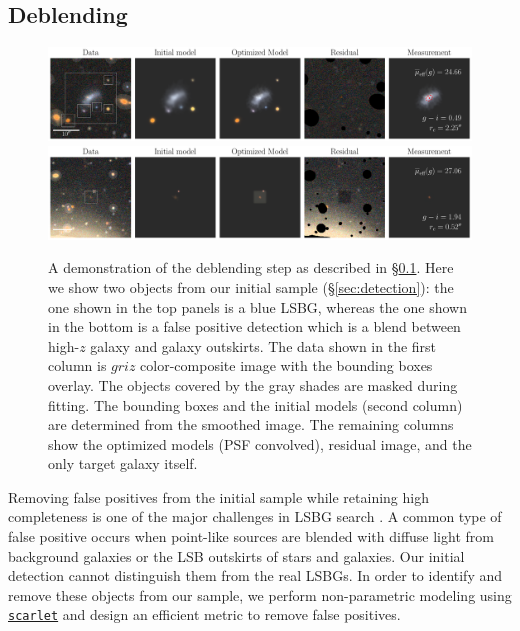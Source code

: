 \documentclass[twocolumn,astrosymb,twocolappendix]{aastex631}
\newcommand{\code}[1]{\texttt{#1}}
\begin{document}
\begin{CJK*}{UTF8}{gbsn}
\subsection{Deblending}\label{sec:deblending}

\begin{figure}
	\vbox{ 
		\centering
		\includegraphics[width=1\linewidth]{vanilla_scarlet_demo.pdf}
		\includegraphics[width=1\linewidth]{vanilla_scarlet_demo2.pdf}
	}
	\caption{A demonstration of the deblending step as described in \S\ref{sec:deblending}. Here we show two objects from our initial sample (\S\ref{sec:detection}): the one shown in the top panels is a blue LSBG, whereas the one shown in the bottom is a false positive detection which is a blend between high-$z$ galaxy and galaxy outskirts. The data shown in the first column is $griz$ color-composite image with the bounding boxes overlay. The objects covered by the gray shades are masked during fitting. The bounding boxes and the initial models (second column) are determined from the smoothed image. The remaining columns show the optimized models (PSF convolved), residual image, and the only target galaxy itself. 
	}
	\label{fig:vanilla_scarlet_demo}
\end{figure}

Removing false positives from the initial sample while retaining high completeness is one of the major challenges in LSBG search \citep[e.g.,][]{vanDokkum2015,Koda2015,Yagi2016,Greco2018,SAGA-I,Zaritsky2019,Zaritsky2021,Tanoglidis2021,Zaritsky2022}. A common type of false positive occurs when point-like sources are blended with diffuse light from background galaxies or the LSB outskirts of stars and galaxies. Our initial detection cannot distinguish them from the real LSBGs. In order to identify and remove these objects from our sample, we perform non-parametric modeling using \href{https://pmelchior.github.io/scarlet/}{\code{scarlet}} \citep{Melchior2018} and design an efficient metric to remove false positives.



\end{CJK*}
\end{document}
